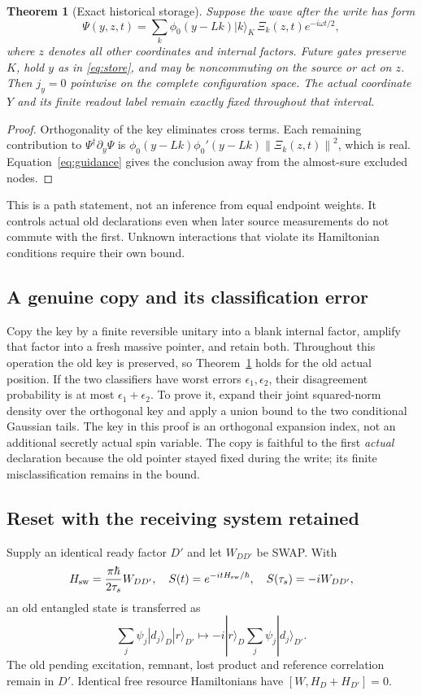 \documentclass[11pt]{article}
\newtheorem{theorem}{Theorem}[section]
\theoremstyle{definition}\newtheorem{assumption}[theorem]{Constitutive assumption}
\theoremstyle{remark}\newtheorem{remark}[theorem]{Remark}
\newcommand{\ket}[1]{|#1\rangle}\newcommand{\bra}[1]{\langle#1|}
\newcommand{\norm}[1]{\left\|#1\right\|}\newcommand{\pos}[1]{[#1]_+}
\begin{document}
\begin{theorem}[Exact historical storage]\label{thm:store}
Suppose the wave after the write has form
\begin{equation}\label{eq:storedwave}
 \Psi(y,z,t)=\sum_k\phi_0(y-Lk)\ket k_K\,\Xi_k(z,t)e^{-i\omega t/2},
\end{equation}
where $z$ denotes all other coordinates and internal factors. Future gates preserve $K$, hold $y$ as in \eqref{eq:store}, and may be noncommuting on the source or act on $z$. Then $j_y=0$ \emph{pointwise} on the complete configuration space. The actual coordinate $Y$ and its finite readout label remain exactly fixed throughout that interval.
\end{theorem}
\begin{proof}
Orthogonality of the key eliminates cross terms. Each remaining contribution to $\Psi^\dagger\partial_y\Psi$ is $\phi_0(y-Lk)\phi_0'(y-Lk)\norm{\Xi_k(z,t)}^2$, which is real. Equation~\eqref{eq:guidance} gives the conclusion away from the almost-sure excluded nodes.
\end{proof}
This is a path statement, not an inference from equal endpoint weights. It controls actual old declarations even when later source measurements do not commute with the first. Unknown interactions that violate its Hamiltonian conditions require their own bound.

\subsection{A genuine copy and its classification error}
Copy the key by a finite reversible unitary into a blank internal factor, amplify that factor into a fresh massive pointer, and retain both. Throughout this operation the old key is preserved, so Theorem~\ref{thm:store} holds for the old actual position. If the two classifiers have worst errors $\epsilon_1,\epsilon_2$, their disagreement probability is at most $\epsilon_1+\epsilon_2$. To prove it, expand their joint squared-norm density over the orthogonal key and apply a union bound to the two conditional Gaussian tails. The key in this proof is an orthogonal expansion index, not an additional secretly actual spin variable. The copy is faithful to the first \emph{actual} declaration because the old pointer stayed fixed during the write; its finite misclassification remains in the bound.

\subsection{Reset with the receiving system retained}
Supply an identical ready factor $D'$ and let $W_{DD'}$ be SWAP. With
\begin{equation}\label{eq:swap}
 H_{\rm sw}=\frac{\pi\hbar}{2\tau_s}W_{DD'},\quad
 S(t)=e^{-itH_{\rm sw}/\hbar},\quad S(\tau_s)=-iW_{DD'},
\end{equation}
an old entangled state is transferred as
\[
 \sum_j\psi_j\ket{d_j}_D\ket r_{D'}\longmapsto
 -i\ket r_D\sum_j\psi_j\ket{d_j}_{D'}.
\]
The old pending excitation, remnant, lost product and reference correlation remain in $D'$. Identical free resource Hamiltonians have $[W,H_D+H_{D'}]=0$.
\end{document}
